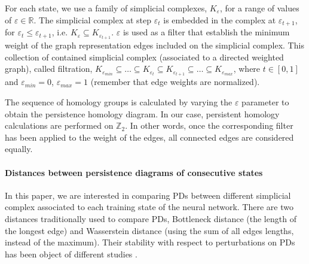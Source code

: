 \documentclass{article}
\begin{document}

For each state, we use a family of simplicial complexes, $K_\varepsilon$, for a range of values of $\varepsilon \in \mathbb{R}$. The simplicial complex at step $\varepsilon_t$ is embedded in the complex at $\varepsilon_{t+1}$, for $\varepsilon_t \leq \varepsilon_{t+1}$, i.e. $K_{\varepsilon} \subseteq K_{\varepsilon_{t+1}}$. $\varepsilon$ is used as a filter that establish the minimum weight of the graph representation edges included on the simplicial complex. This collection of contained simplicial complex (associated to a directed weighted graph), called filtration, $K_{\varepsilon_{min}} \subseteq \ldots \subseteq K_{\varepsilon_t} \subseteq K_{\varepsilon_{t+1}} \subseteq \ldots \subseteq K_{\varepsilon_{max}}$, where $t \in [0,1]$ and $\varepsilon_{min} = 0$, $\varepsilon_{max} = 1$ (remember that edge weights are normalized).

The sequence of homology groups is calculated by varying the $\varepsilon$ parameter to obtain the persistence homology diagram. In our case, persistent homology calculations are performed on $\mathbb{Z}_2$. In other words, once the corresponding filter has been applied to the weight of the edges, all connected edges are considered equally.



\paragraph{Distances between persistence diagrams of consecutive states}
In this paper, we are interested in comparing PDs between different simplicial complex associated to each training state of the neural network. There are two distances traditionally used to compare PDs, Bottleneck distance (the length of the longest edge) and Wasserstein distance (using the sum of all edges lengths, instead of the maximum). Their stability with respect to perturbations on PDs has been object of different studies \cite{Chazal2012PersistenceSF, CohenSteiner2005StabilityOP}.
\end{document}
